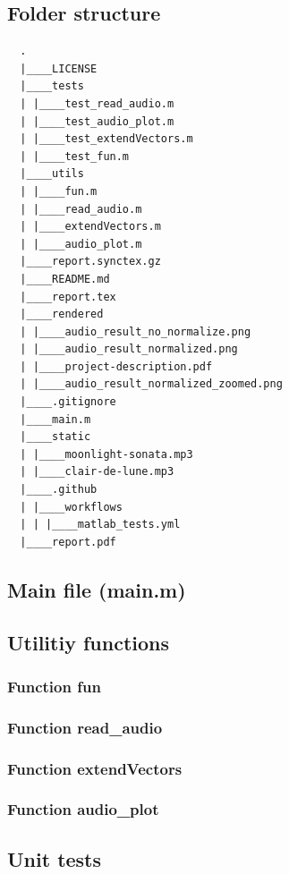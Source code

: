 \documentclass[a4paper,12pt]{article}
\begin{document}
\subsection*{Folder structure}
\begin{verbatim}
  .
  |____LICENSE
  |____tests
  | |____test_read_audio.m
  | |____test_audio_plot.m
  | |____test_extendVectors.m
  | |____test_fun.m
  |____utils
  | |____fun.m
  | |____read_audio.m
  | |____extendVectors.m
  | |____audio_plot.m
  |____report.synctex.gz
  |____README.md
  |____report.tex
  |____rendered
  | |____audio_result_no_normalize.png
  | |____audio_result_normalized.png
  | |____project-description.pdf
  | |____audio_result_normalized_zoomed.png
  |____.gitignore
  |____main.m
  |____static
  | |____moonlight-sonata.mp3
  | |____clair-de-lune.mp3
  |____.github
  | |____workflows
  | | |____matlab_tests.yml
  |____report.pdf
\end{verbatim}

\subsection*{Main file (main.m)}


\pagebreak
\subsection*{Utilitiy functions}

\subsubsection*{Function fun}

\subsubsection*{Function read\_audio}

\subsubsection*{Function extendVectors}

\subsubsection*{Function audio\_plot}


\pagebreak
\subsection*{Unit tests}
\end{document}
